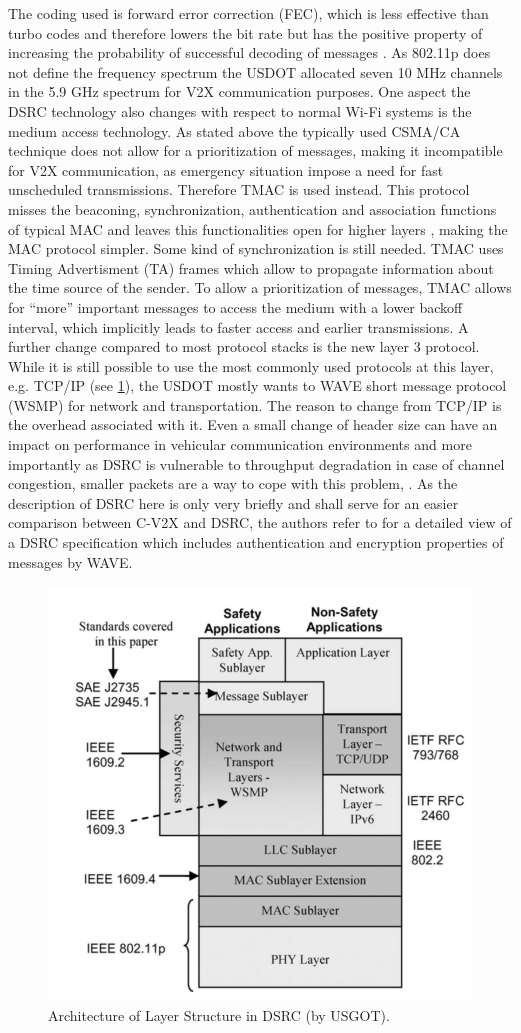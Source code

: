 \documentclass[conference,12pt,onecolumn]{IEEEtran}
\begin{document}
The coding used is forward error correction (FEC), which is less effective than turbo codes and therefore lowers the bit rate but has the positive property of increasing the probability of successful decoding of messages \cite{kenney2011}. As 802.11p does not define the frequency spectrum the USDOT allocated seven 10 MHz channels in the 5.9 GHz spectrum for V2X communication purposes. One aspect the DSRC technology also changes with respect to normal Wi-Fi systems is the medium access technology. As stated above the typically used CSMA/CA technique does not allow for a prioritization of messages, making it incompatible for V2X communication, as emergency situation impose a need for fast unscheduled transmissions. Therefore TMAC is used instead. This protocol misses the beaconing, synchronization, authentication and association functions of typical MAC and leaves this functionalities open for higher layers \cite{kenney2011}, making the MAC protocol simpler. Some kind of synchronization is still needed. TMAC uses Timing Advertisment (TA) frames which allow to propagate information about the time source of the sender. To allow a prioritization of messages, TMAC allows for ``more'' important messages to access the medium with a lower backoff interval, which implicitly leads to faster access and earlier transmissions.
A further change compared to most protocol stacks is the new layer 3 protocol. While it is still possible to use the most commonly used protocols at this layer, e.g. TCP/IP (see \ref{fig:architecture_DSRC}), the USDOT mostly wants to WAVE short message protocol (WSMP) for network and transportation. The reason to change from TCP/IP is the overhead associated with it. Even a small change of header size can have an impact on performance in vehicular communication environments \cite{kenney2011} and more importantly as DSRC is vulnerable to throughput degradation in case of channel congestion, smaller packets are a way to cope with this problem\cite{machardy2018}, \cite{kenney2011}. As the description of DSRC here is only very briefly and shall serve for an easier comparison between C-V2X and DSRC, the authors refer to \cite{kenney2011} for a detailed view of a DSRC specification which includes authentication and encryption properties of messages by WAVE.

\begin{figure} [ht]
   \centering
  \includegraphics[width=0.5\linewidth]{_Graphics/layer_architecture_dsrc.png}
  \caption{Architecture of Layer Structure in DSRC (by USGOT). \cite{kenney2011}}
  \label{fig:architecture_DSRC}
\end{figure}
\end{document}
